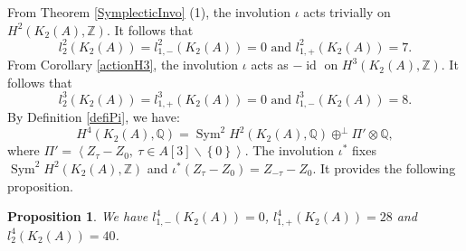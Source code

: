 \documentclass{alggeom}
\DeclareMathOperator{\id}{id}
\DeclareMathOperator{\Sym}{Sym}
\DeclareMathOperator{\rk}{rk}
\newcommand{\Q}{\mathbb{Q}}
\newcommand{\Z}{\mathbb{Z}}
\theoremstyle{plain}
\newtheorem{prop}[theorem]{Proposition}
\theoremstyle{definition}
\theoremstyle{remark}
\begin{document}
From Theorem \ref{SymplecticInvo} (1), the involution $\iota$ acts trivially on $H^{2}(K_{2}(A),\Z)$.
It follows that
\begin{equation}
l_{2}^2(K_{2}(A))=l_{1,-}^2(K_{2}(A))=0 \text{ and } l_{1,+}^2(K_{2}(A))=7.
\label{l22}
\end{equation}
From Corollary \ref{actionH3}, the involution $\iota$ acts as $-\id$ on $H^{3}(K_{2}(A),\Z)$.
It follows that
\begin{equation}
l_{2}^3(K_{2}(A))=l_{1,+}^3(K_{2}(A))=0 \text{ and } l_{1,-}^3(K_{2}(A))=8.
\label{l3}
\end{equation}
By Definition \ref{defiPi}, we have:
$$H^{4}(K_{2}(A),\Q)=\Sym^{2} H^{2}(K_{2}(A),\Q)\oplus^{\bot} \Pi'\otimes\Q,$$
where $\Pi'=\left\langle Z_{\tau}-Z_{0},\ \tau\in A[3]\smallsetminus \left\{0\right\}\right\rangle$. The involution
$\iota^*$ fixes $\Sym^{2} H^{2}(K_{2}(A),\Z)$ and $\iota^*(Z_{\tau}-Z_{0})=Z_{-\tau}-Z_{0}$. It provides the following proposition.
\begin{prop}\label{invariants}
We have $l_{1,-}^4(K_{2}(A))=0$, $l_{1,+}^4(K_{2}(A))=28$ and $l_{2}^4(K_{2}(A))=40$.
\end{prop}
\end{document}
